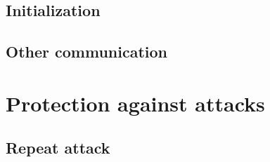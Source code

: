 \subsection{Initialization}
\label{subsec:init_phase}


\subsection{Other communication}
\label{subsec:other_phase}


\section{Protection against attacks}
\label{sec:attacks_protection}


\subsection{Repeat attack}
\label{subsec:repeat_attack}

